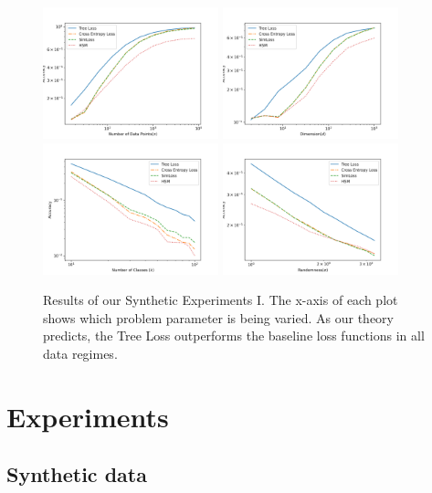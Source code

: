 \documentclass[twoside]{article}
\begin{document}
\begin{figure}
\includegraphics[width=\columnwidth,height=1.5in]{fig/images/accuracy_vs_n.png}
\includegraphics[width=\columnwidth,height=1.5in]{fig/images/accuracy_vs_d.png}
\includegraphics[width=\columnwidth,height=1.5in]{fig/images/accuracy_vs_class.png}
\includegraphics[width=\columnwidth,height=1.5in]{fig/images/accuracy_vs_sigma.png}
\caption{
    Results of our Synthetic Experiments I.
    The x-axis of each plot shows which problem parameter is being varied.
    As our theory predicts, the Tree Loss outperforms the baseline loss functions in all data regimes.
}
\label{fig:synth:1}
\end{figure}

\section{Experiments}

\subsection{Synthetic data}
\end{document}
